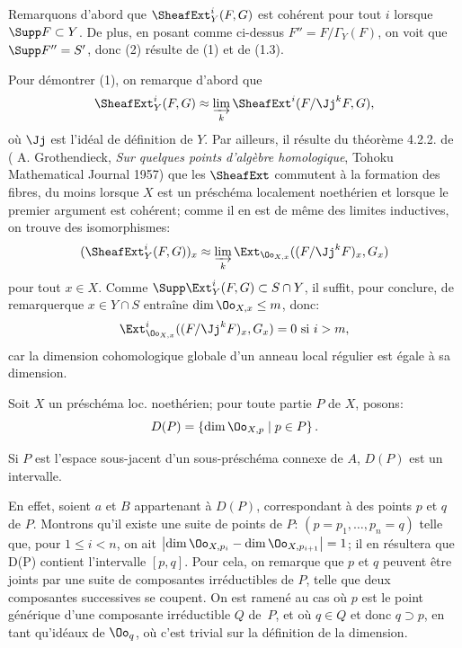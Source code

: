 Remarquons d'abord que $\SheafExt^i_Y (F, G)$ est coh\'erent pour tout $i$ lorsque $\Supp F \subset Y$. De plus, en posant comme ci-dessus $F'' = F/\Gamma_Y(F)$, on voit que $\Supp F'' = S'$, donc (2) r\'esulte de (1) et de (1.3).

Pour d\'emontrer (1), on remarque d'abord que
\[
\SheafExt^i_Y (F, G) \approx \varinjlim_{k} \SheafExt^i (F/\Jj^k F, G),
\]
o\`u $\Jj$ est l'id\'eal de d\'efinition de $Y$. Par ailleurs, il
r\'esulte du th\'eor\`eme 4.2.2. de ( A. Grothendieck,
\textit{Sur quelques points d'alg\`ebre homologique}, Tohoku
Mathematical Journal 1957) que les $\SheafExt$ commutent \`a
la formation des fibres, du moins lorsque $X$ est un pr\'esch\'ema
localement noeth\'erien et lorsque le premier argument est coh\'erent;
comme il en est de m\^eme des limites inductives, on trouve des
isomorphismes:
\[
(\SheafExt^i_Y (F, G))_x \approx \varinjlim_{k} \Ext_{\Oo_{X, x}} ((F/\Jj^k F)_x, G_x)
\]
pour tout $x \in X$. Comme $\Supp \Ext^i_Y (F, G) \subset S \cap Y$, il suffit, pour conclure, de remarquer\pageoriginale que $x \in Y \cap S$ entra\^ine $\dim \Oo_{X, x} \leq m$, donc:
\[
\Ext^i_{\Oo_{X, x}} ((F/\Jj^k F)_x, G_x) = 0 \text { si } i > m,
\]
car la dimension cohomologique globale d'un anneau local r\'egulier est \'egale \`a sa dimension.

Soit $X$ un pr\'esch\'ema loc. noeth\'erien; pour toute partie $P$ de $X$, posons:
\[
D(P) = \left\{ \dim \Oo_{X, p} \mid p \in P \right\}.
\]

\begin{lemme}\label{VII.2.2}
Si $P$ est l'espace sous-jacent d'un sous-pr\'esch\'ema connexe de $A$, $D(P)$ est un intervalle.
\end{lemme}

En effet, soient $a$ et $B$ appartenant \`a $D(P)$, correspondant \`a des points $p$ et $q$ de $P$. Montrons qu'il existe une suite de points de $P$: $(p = p_1, \dots, p_n = q)$ telle que, pour $1 \leq i < n $, on ait $\left| \dim \Oo_{X, p_i} - \dim \Oo_{X, p_{i+1}} \right| = 1$; il en r\'esultera que D(P) contient l'intervalle $[p, q]$. Pour cela, on remarque que $p$ et $q$ peuvent \^etre joints par une suite de composantes irr\'eductibles de $P$, telle que deux composantes successives se coupent. On est ramen\'e au cas o\`u $p$ est le point g\'en\'erique d'une composante irr\'eductible $Q$ de~$P$, et o\`u $q \in Q$ et donc $q \supset p$, en tant qu'id\'eaux de $\Oo_q$, o\`u c'est trivial sur la d\'efinition de la dimension.

